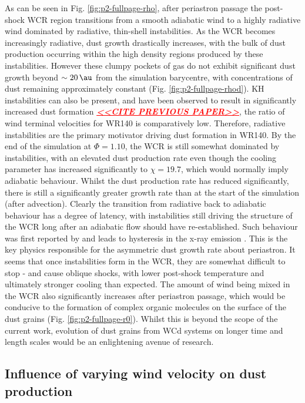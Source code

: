 \documentclass[fleqn,usenatbib]{mnras}
\begin{document}
As can be seen in Fig. \ref{fig:p2-fullpage-rho}, after periastron passage the post-shock WCR region transitions from a smooth adiabatic wind to a highly radiative wind dominated by radiative, thin-shell instabilities.
As the WCR becomes increasingly radiative, dust growth drastically increases, with the bulk of dust production occurring within the high density regions produced by these instabilities.
However these clumpy pockets of gas do not exhibit significant dust growth beyond $\sim \SI{20}{\au}$ from the simulation barycentre, with concentrations of dust remaining approximately constant (Fig. \ref{fig:p2-fullpage-rhod}).
KH instabilities can also be present, and have been observed to result in significantly increased dust formation \textcolor{red}{\underline{\emph{\textbf{<<CITE PREVIOUS PAPER>>}}}}, the ratio of wind terminal velocities for WR140 is comparatively low.
Therefore, radiative instabilities are the primary motivator driving dust formation in WR140.
By the end of the simulation at $\Phi = 1.10$, the WCR is still somewhat dominated by instabilities, with an elevated dust production rate even though the cooling parameter has increased significantly to $\chi = 19.7$, which would normally imply adiabatic behaviour.
Whilst the dust production rate has reduced significantly, there is still a significantly greater growth rate than at the start of the simulation (after advection).
Clearly the transition from radiative back to adiabatic behaviour has a degree of latency, with instabilities still driving the structure of the WCR long after an adiabatic flow should have re-established.
Such behaviour was first reported by \cite{pittard_3d_2009} and leads to hysteresis in the x-ray emission \citep{pittard_3d_2010}.
This is the key physics responsible for the asymmetric dust growth rate about periastron.
It seems that once instabilities form in the WCR, they are somewhat difficult to stop - and cause oblique shocks, with lower post-shock temperature and ultimately stronger cooling than expected.
The amount of wind being mixed in the WCR also significantly increases after periastron passage, which would be conducive to the formation of complex organic molecules on the surface of the dust grains (Fig. \ref{fig:p2-fullpage-r0}).
Whilst this is beyond the scope of the current work, evolution of dust grains from WCd systems on longer time and length scales would be an enlightening avenue of research.

\subsection{Influence of varying wind velocity on dust production}
\end{document}
